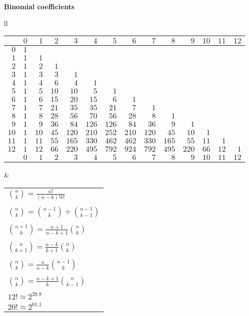 \documentclass[a4paper, 12pt]{article}
\newcommand{\Topic}[1]{\textbf{#1}}
\begin{document}
\Topic{Binomial coefficients}

\begin{tabular}{ll}
  \begin{tabular}{r|rrrrrrrrrrrrr}
  & $0$ & $1$ & $2$ & $3$ & $4$ & $5$ & $6$ & $7$ & $8$ & $9$ & $10$ & $11$ & $12$ \\
  \hline
  $0$ & $1$\\
  $1$ & $1$ & $1$\\
  $2$ & $1$ & $2$ & $1$\\
  $3$ & $1$ & $3$ & $3$ & $1$\\
  $4$ & $1$ & $4$ & $6$ & $4$ & $1$\\
  $5$ & $1$ & $5$ & $10$ & $10$ & $5$ & $1$\\
  $6$ & $1$ & $6$ & $15$ & $20$ & $15$ & $6$ & $1$\\
  $7$ & $1$ & $7$ & $21$ & $35$ & $35$ & $21$ & $7$ & $1$\\
  $8$ & $1$ & $8$ & $28$ & $56$ & $70$ & $56$ & $28$ & $8$ & $1$\\
  $9$ & $1$ & $9$ & $36$ & $84$ & $126$ & $126$ & $84$ & $36$ & $9$ & $1$\\
  $10$ & $1$ & $10$ & $45$ & $120$ & $210$ & $252$ & $210$ & $120$ & $45$ & $10$ & $1$\\
  $11$ & $1$ & $11$ & $55$ & $165$ & $330$ & $462$ & $462$ & $330$ & $165$ & $55$ & $11$ & $1$\\
  $12$ & $1$ & $12$ & $66$ & $220$ & $495$ & $792$ & $924$ & $792$ & $495$ & $220$ & $66$ & $12$ & $1$ \\
  \hline
  & $0$ & $1$ & $2$ & $3$ & $4$ & $5$ & $6$ & $7$ & $8$ & $9$ & $10$ & $11$ & $12$
  \end{tabular}
&

\begin{tabular}{l}
${n \choose k} = \frac{n!}{(n-k)!k!}$                 \\ \\
${n \choose k} = {n-1 \choose k} + {n-1 \choose k-1}$ \\ \\
${n+1 \choose k} = \frac{n+1}{n-k+1} {n \choose k}$   \\ \\
${n \choose k+1} = \frac{n-k}{k+1} {n \choose k}$     \\ \\
${n \choose k} = \frac{n}{n-k} {n-1 \choose k}$       \\ \\
${n \choose k} = \frac{n-k+1}{k} {n \choose k-1}$     \\ \\

$12! \approx 2^{28.8}$ \\
$20! \approx 2^{61.1}$


\end{tabular}
\end{tabular}
\end{document}
